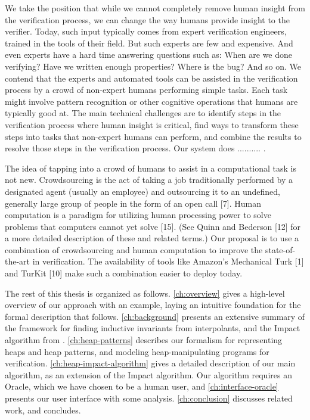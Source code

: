 We take the position that while we cannot completely remove human insight from the verification process, we can change the way humans provide insight to the verifier. Today, such input typically comes from expert verification engineers, trained in the tools of their field. But such experts are few and expensive. And even experts have a hard time answering questions such as: When are we done verifying? Have we written enough properties? Where is the bug? And so on. We contend that the experts and automated tools can be assisted in the verification process by a crowd of non-expert humans performing simple tasks. Each task might involve pattern recognition or other cognitive operations that humans are typically good at. The main technical challenges are to identify steps in the verification process where human insight is critical, find ways to transform these steps into tasks that non-expert humans can perform, and combine the results to resolve those steps in the verification process. Our system does .......... .

The idea of tapping into a crowd of humans to assist in a computational
task is not new. Crowdsourcing is the act of taking a
job traditionally performed by a designated agent (usually an employee)
and outsourcing it to an undefined, generally large group
of people in the form of an open call [7]. Human computation is a
paradigm for utilizing human processing power to solve problems
that computers cannot yet solve [15]. (See Quinn and Bederson [12]
for a more detailed description of these and related terms.) Our proposal
is to use a combination of crowdsourcing and human computation
to improve the state-of-the-art in verification. The availability
of tools like Amazon’s Mechanical Turk [1] and TurKit [10] make
such a combination easier to deploy today.



The rest of this thesis is organized as follows. \autoref{ch:overview} gives a high-level overview of our approach with an example, laying an intuitive foundation for the formal description that follows. \autoref{ch:background} presents an extensive summary of the framework for finding inductive invariants from interpolants, and the Impact algorithm from \cite{mcmillan06}. \autoref{ch:heap-patterns} describes our formalism for representing heaps and heap patterns, and modeling heap-manipulating programs for verification. \autoref{ch:heap-impact-algorithm} gives a detailed description of our main algorithm, as an extension of the Impact algorithm. Our algorithm requires an Oracle, which we have chosen to be a human user, and \autoref{ch:interface-oracle} presents our user interface with some analysis. \autoref{ch:conclusion} discusses related work, and concludes.


